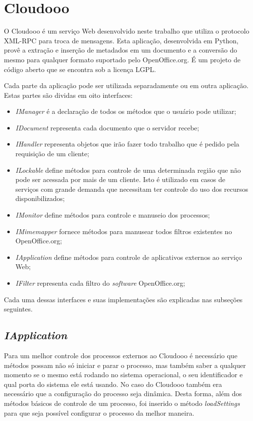 \chapter{Cloudooo}
\label{cap4}

O Cloudooo é um serviço Web desenvolvido neste trabalho que utiliza o protocolo XML-RPC para troca de mensagens. Esta aplicação, desenvolvida em Python, provê a extração e inserção de metadados em um documento e a conversão do mesmo para qualquer formato suportado pelo OpenOffice.org. É um projeto de código aberto que se encontra sob a licença LGPL.

Cada parte da aplicação pode ser utilizada separadamente ou em outra aplicação. Estas partes são dividas em oito interfaces:
\begin{itemize}
\item \textit{IManager} é a declaração de todos os métodos que o usuário pode utilizar;
\item \textit{IDocument} representa cada documento que o servidor recebe;
\item \textit{IHandler} representa objetos que irão fazer todo trabalho que é pedido pela requisição de um cliente; 
\item \textit{ILockable} define métodos para controle de uma determinada região que não pode ser acessada por mais de um cliente. Isto é utilizado em casos de serviços com grande demanda que necessitam ter controle do uso dos recursos disponibilizados; 
\item \textit{IMonitor} define métodos para controle e manuseio dos processos;
\item \textit{IMimemapper} fornece métodos para manusear todos filtros existentes no OpenOffice.org;
\item \textit{IApplication} define métodos para controle de aplicativos externos ao serviço Web;
\item \textit{IFilter} representa cada filtro do \textit{software} OpenOffice.org;
\end{itemize}

Cada uma dessas interfaces e suas implementações são explicadas nas subseções seguintes.

\section{\textit{IApplication}}
\label{iapp}
Para um melhor controle dos processos externos ao Cloudooo é necessário que métodos possam não só iniciar e parar o processo, mas também saber a qualquer momento se o mesmo está rodando no sistema operacional, o seu identificador e qual porta do sistema ele está usando. No caso do Cloudooo também era necessário que a configuração do processo seja dinâmica. Desta forma, além dos métodos básicos de controle de um processo, foi inserido o método \textit{loadSettings} para que seja possível configurar o processo da melhor maneira.

